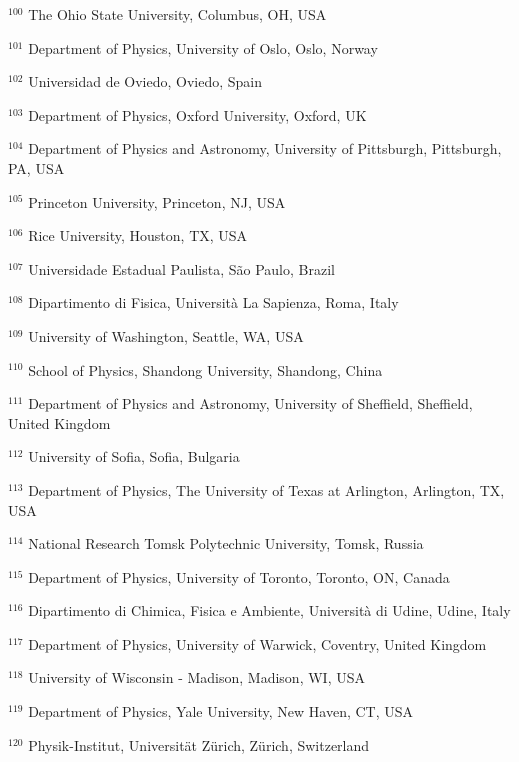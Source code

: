 \par {\footnotesize $^{100}$ The Ohio State University, Columbus, OH, USA}
\par {\footnotesize $^{101}$ Department of Physics, University of Oslo, Oslo, Norway}
\par {\footnotesize $^{102}$ Universidad de Oviedo, Oviedo, Spain}
\par {\footnotesize $^{103}$ Department of Physics, Oxford University, Oxford, UK}
\par {\footnotesize $^{104}$ Department of Physics and Astronomy, University of Pittsburgh, Pittsburgh, PA, USA}
\par {\footnotesize $^{105}$ Princeton University, Princeton, NJ, USA}
\par {\footnotesize $^{106}$ Rice University, Houston, TX, USA}
\par {\footnotesize $^{107}$ Universidade Estadual Paulista, São Paulo, Brazil}
\par {\footnotesize $^{108}$ Dipartimento di Fisica, Università La Sapienza, Roma, Italy}
\par {\footnotesize $^{109}$ University of Washington, Seattle, WA, USA}
\par {\footnotesize $^{110}$ School of Physics, Shandong University, Shandong, China}
\par {\footnotesize $^{111}$ Department of Physics and Astronomy, University of Sheffield, Sheffield, United Kingdom}
\par {\footnotesize $^{112}$ University of Sofia, Sofia, Bulgaria}
\par {\footnotesize $^{113}$ Department of Physics, The University of Texas at Arlington, Arlington, TX, USA}
\par {\footnotesize $^{114}$ National Research Tomsk Polytechnic University, Tomsk, Russia}
\par {\footnotesize $^{115}$ Department of Physics, University of Toronto, Toronto, ON, Canada}
\par {\footnotesize $^{116}$ Dipartimento di Chimica, Fisica e Ambiente, Università di Udine, Udine, Italy}
\par {\footnotesize $^{117}$ Department of Physics, University of Warwick, Coventry, United Kingdom}
\par {\footnotesize $^{118}$ University of Wisconsin - Madison, Madison, WI, USA}
\par {\footnotesize $^{119}$ Department of Physics, Yale University, New Haven, CT, USA}
\par {\footnotesize $^{120}$ Physik-Institut, Universität Zürich, Zürich, Switzerland}
